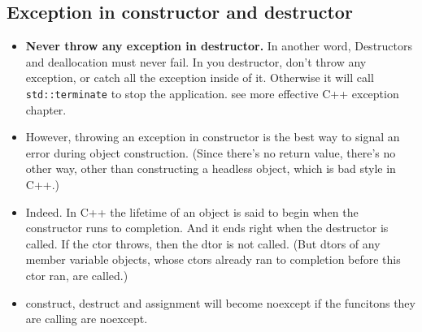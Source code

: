 \documentclass[a4paper,11pt,twoside]{book}
\begin{document}
\subsection{Exception in constructor and destructor}
\begin{itemize}
	\item \textbf{Never throw any exception in destructor.} In another word, Destructors and deallocation must never fail. In you destructor, don't throw any exception, or catch all the exception inside of it. Otherwise it will call \texttt{std::terminate} to stop the application. see more effective C++ exception chapter.
	
	\item However, throwing an exception in constructor is the best way to signal an error during object construction. (Since there's no return value, there's no other way, other than constructing a headless object, which is bad style in C++.)
	
	\item Indeed. In C++ the lifetime of an object is said to begin when the constructor runs to completion. And it ends right when the destructor is called. If the ctor throws, then the dtor is not called. (But dtors of any member variable objects, whose ctors already ran to completion before this ctor ran, are called.)
	
	\item construct, destruct and assignment will become noexcept if the funcitons they are calling are noexcept. 
	
\end{itemize}
\end{document}
